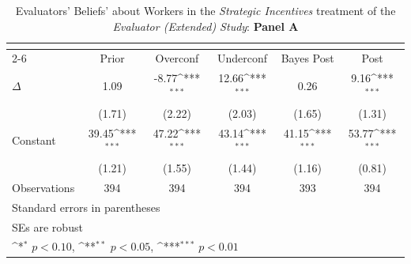 \begin{table}[htbp]\centering
\def\sym#1{\ifmmode^{#1}\else\(^{#1}\)\fi}
\caption{Evaluators' Beliefs' about Workers in the \textit{Strategic Incentives} treatment of the \textit{Evaluator (Extended) Study}: \textbf{Panel A}}
\begin{tabular}{l*{5}{c}}
\hline\hline
                &\multicolumn{5}{c}{}                                                                          \\\cmidrule(lr){2-6}
                &\multicolumn{1}{c}{Prior}&\multicolumn{1}{c}{Overconf}&\multicolumn{1}{c}{Underconf}&\multicolumn{1}{c}{Bayes Post}&\multicolumn{1}{c}{Post}\\
\hline
$\Delta$        &     1.09         &    -8.77\sym{***}&    12.66\sym{***}&     0.26         &     9.16\sym{***}\\
                &   (1.71)         &   (2.22)         &   (2.03)         &   (1.65)         &   (1.31)         \\
Constant        &    39.45\sym{***}&    47.22\sym{***}&    43.14\sym{***}&    41.15\sym{***}&    53.77\sym{***}\\
                &   (1.21)         &   (1.55)         &   (1.44)         &   (1.16)         &   (0.81)         \\
\hline
Observations    &      394         &      394         &      394         &      393         &      394         \\
\hline\hline
\multicolumn{6}{l}{\footnotesize Standard errors in parentheses}\\
\multicolumn{6}{l}{\footnotesize SEs are robust}\\
\multicolumn{6}{l}{\footnotesize \sym{*} \(p<0.10\), \sym{**} \(p<0.05\), \sym{***} \(p<0.01\)}\\
\end{tabular}
\end{table}
